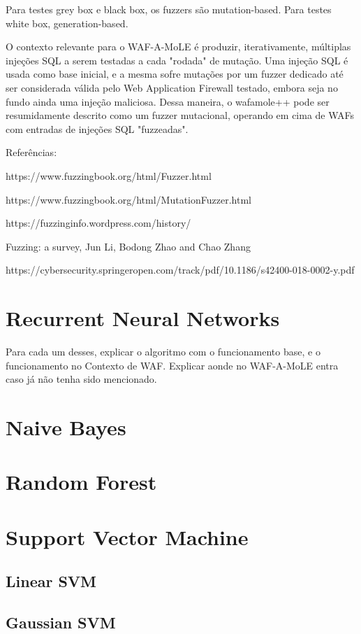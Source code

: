 Para testes grey box e black box, os fuzzers são mutation-based. Para testes white box, generation-based.

O contexto relevante para o WAF-A-MoLE é produzir, iterativamente, múltiplas injeções SQL a serem testadas a cada "rodada" de mutação. Uma injeção SQL é usada como base inicial, e a mesma sofre mutações por um fuzzer dedicado até ser considerada válida pelo Web Application Firewall testado, embora seja no fundo ainda uma injeção maliciosa. Dessa maneira, o wafamole++ pode ser resumidamente descrito como um fuzzer mutacional, operando em cima de WAFs com entradas de injeções SQL "fuzzeadas".

Referências:

https://www.fuzzingbook.org/html/Fuzzer.html

https://www.fuzzingbook.org/html/MutationFuzzer.html

https://fuzzinginfo.wordpress.com/history/

Fuzzing: a survey, Jun Li, Bodong Zhao and Chao Zhang

https://cybersecurity.springeropen.com/track/pdf/10.1186/s42400-018-0002-y.pdf

\section{Recurrent Neural Networks}

Para cada um desses, explicar o algoritmo com o funcionamento base, e o funcionamento no Contexto de WAF. Explicar aonde no WAF-A-MoLE entra caso já não tenha sido mencionado. 

\section{Naive Bayes}

\section{Random Forest}

\section{Support Vector Machine}

\subsection{Linear SVM}

\subsection{Gaussian SVM}






